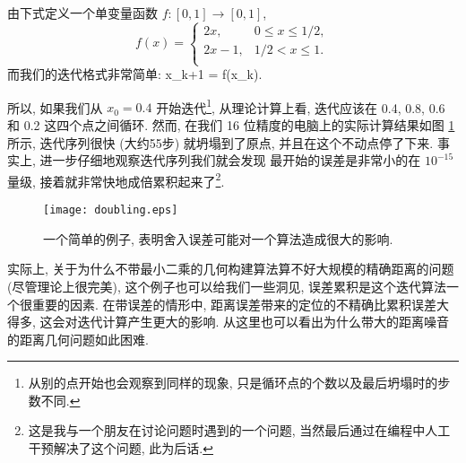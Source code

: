 由下式定义一个单变量函数 $f: [0,1]\rightarrow [0,1]$,
\begin{equation}
  f(x)=
  \left\{
    \begin{array}{ll}
      2x,  & 0\leq x \leq 1/2, \\
      2x-1, & 1/2<x\leq 1. \\
    \end{array}
  \right.
\end{equation}
而我们的迭代格式非常简单:
\be x_{k+1} = f(x_k). \ee

所以, 如果我们从 $x_0 = 0.4$ 开始迭代\footnote{从别的点开始也会观察到同样的现象, 只是循环点的个数以及最后坍塌时的步数不同.}, 
从理论计算上看, 迭代应该在 0.4, 0.8, 0.6 和 0.2 这四个点之间循环. 
然而, 在我们 16 位精度的电脑上的实际计算结果如图 \ref{fig:doubling} 所示, 
迭代序列很快 (大约55步) 就坍塌到了原点, 并且在这个不动点停了下来.
事实上, 进一步仔细地观察迭代序列我们就会发现
最开始的误差是非常小的\pozhe 在 $10^{-15}$ 量级, 
接着就非常快地成倍累积起来了\footnote{这是我与一个朋友在讨论问题时遇到的一个问题, 当然最后通过在编程中人工干预解决了这个问题, 此为后话.}.

\begin{figure}[htp]
  \centering
  \texttt{[image: doubling.eps]}\\
  \caption{一个简单的例子, 表明舍入误差可能对一个算法造成很大的影响.}
  \label{fig:doubling}
\end{figure}

实际上, 关于为什么不带最小二乘的几何构建算法算不好大规模的精确距离的问题 
(尽管理论上很完美),
这个例子也可以给我们一些洞见, 误差累积是这个迭代算法一个很重要的因素.
在带误差的情形中, 距离误差带来的定位的不精确比累积误差大得多,
这会对迭代计算产生更大的影响. 
从这里也可以看出为什么带大的距离噪音的距离几何问题如此困难.



